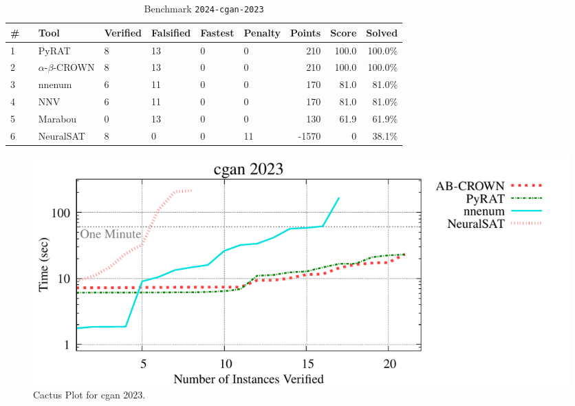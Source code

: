 \begin{table}[h]
\begin{center}
\caption{Benchmark \texttt{2024-cgan-2023}} \label{tab:cat_{cat}}
{\setlength{\tabcolsep}{2pt}
\begin{tabular}[h]{@{}llllllrrr@{}}
\toprule
\textbf{\# ~} & \textbf{Tool} & \textbf{Verified} & \textbf{Falsified} & \textbf{Fastest} & \textbf{Penalty} & \textbf{Points} & \textbf{Score} & \textbf{Solved}\\
\midrule
1 & PyRAT & 8 & 13 & 0 & 0 & 210 & 100.0 & 100.0\% \\
2 & $\alpha$-$\beta$-CROWN & 8 & 13 & 0 & 0 & 210 & 100.0 & 100.0\% \\
3 & nnenum & 6 & 11 & 0 & 0 & 170 & 81.0 & 81.0\% \\
4 & NNV & 6 & 11 & 0 & 0 & 170 & 81.0 & 81.0\% \\
5 & Marabou & 0 & 13 & 0 & 0 & 130 & 61.9 & 61.9\% \\
6 & NeuralSAT & 8 & 0 & 0 & 11 & -1570 & 0 & 38.1\% \\
\bottomrule
\end{tabular}
}
\end{center}
\end{table}



\begin{figure}[h]
\centerline{\includegraphics[width=\textwidth]{cactus/2024_cgan_2023.pdf}}
\caption{Cactus Plot for cgan 2023.}
\label{fig:quantPic}
\end{figure}


\clearpage

